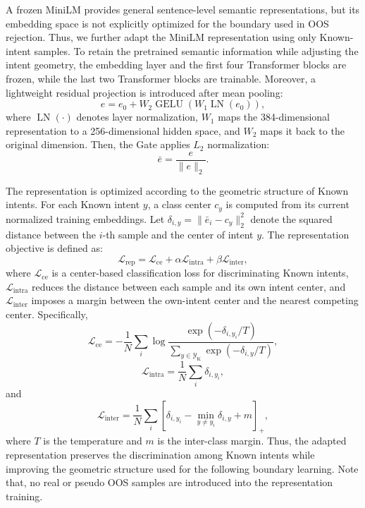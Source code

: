 \documentclass[11pt]{article}
\begin{document}
A frozen MiniLM provides general sentence-level semantic representations, but its embedding space is not explicitly optimized for the boundary used in OOS rejection. Thus, we further adapt the MiniLM representation using only Known-intent samples. To retain the pretrained semantic information while adjusting the intent geometry, the embedding layer and the first four Transformer blocks are frozen, while the last two Transformer blocks are trainable. Moreover, a lightweight residual projection is introduced after mean pooling:
\begin{equation}
e=e_0+W_2\operatorname{GELU}\left(W_1\operatorname{LN}(e_0)\right),
\end{equation}
where $\operatorname{LN}(\cdot)$ denotes layer normalization, $W_1$ maps the 384-dimensional representation to a 256-dimensional hidden space, and $W_2$ maps it back to the original dimension. Then, the Gate applies $L_2$ normalization:
\begin{equation}
\bar{e}=\frac{e}{\|e\|_2}.
\end{equation}

The representation is optimized according to the geometric structure of Known intents. For each Known intent $y$, a class center $c_y$ is computed from its current normalized training embeddings. Let $\delta_{i,y}=\|\bar{e}_i-c_y\|_2^2$ denote the squared distance between the $i$-th sample and the center of intent $y$. The representation objective is defined as:
\begin{equation}
\mathcal{L}_{\mathrm{rep}}=\mathcal{L}_{\mathrm{ce}}+\alpha\mathcal{L}_{\mathrm{intra}}+\beta\mathcal{L}_{\mathrm{inter}},
\label{eq:rep_loss}
\end{equation}
where $\mathcal{L}_{\mathrm{ce}}$ is a center-based classification loss for discriminating Known intents, $\mathcal{L}_{\mathrm{intra}}$ reduces the distance between each sample and its own intent center, and $\mathcal{L}_{\mathrm{inter}}$ imposes a margin between the own-intent center and the nearest competing center. Specifically,
\begin{equation}
\mathcal{L}_{\mathrm{ce}}=-\frac{1}{N}\sum_i\log\frac{\exp(-\delta_{i,y_i}/T)}{\sum_{y\in\mathcal{Y}_{\mathrm{K}}}\exp(-\delta_{i,y}/T)},
\end{equation}
\begin{equation}
\mathcal{L}_{\mathrm{intra}}=\frac{1}{N}\sum_i\delta_{i,y_i},
\end{equation}
and
\begin{equation}
\mathcal{L}_{\mathrm{inter}}=\frac{1}{N}\sum_i\left[\delta_{i,y_i}-\min_{y\neq y_i}\delta_{i,y}+m\right]_{+},
\end{equation}
where $T$ is the temperature and $m$ is the inter-class margin. Thus, the adapted representation preserves the discrimination among Known intents while improving the geometric structure used for the following boundary learning. Note that, no real or pseudo OOS samples are introduced into the representation training.
\end{document}
